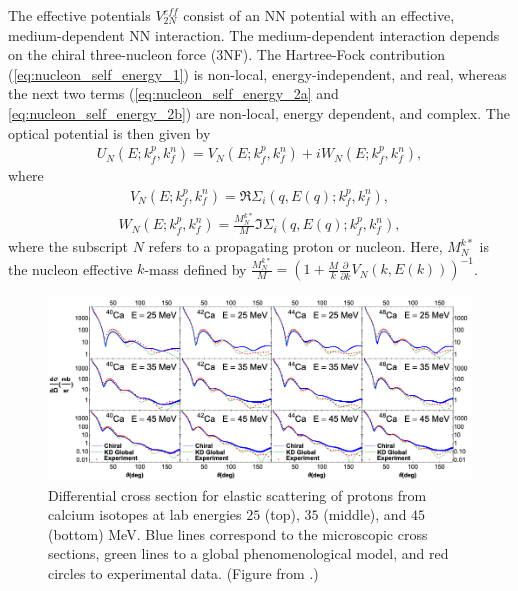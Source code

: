 \documentclass[preprintnumbers,floatfix,aps,prc,preprint,nofootinbib]{revtex4-1}
\begin{document}
The effective potentials $V_{2N}^{eff}$ consist of an NN potential with an effective, medium-dependent NN interaction. The medium-dependent interaction depends on the chiral three-nucleon force (3NF). The Hartree-Fock contribution (\ref{eq:nucleon_self_energy_1}) is non-local, energy-independent, and real, whereas the next two terms (\ref{eq:nucleon_self_energy_2a} and \ref{eq:nucleon_self_energy_2b}) are non-local, energy dependent, and complex. The optical potential is  then given by
%
\begin{eqnarray}
	\label{eq:nucleon_self_energy_optical_potential}
	U_N(E; k_f^p, k_f^n) = V_N(E; k_f^p, k_f^n) + i W_N(E; k_f^p, k_f^n),
\end{eqnarray}
%
where
\begin{eqnarray}
	\label{eq:nucleon_self_energy_optical_potential_real}
	V_N(E; k_f^p, k_f^n) = \Re \Sigma_i (q, E(q); k_f^p, k_f^n),
\end{eqnarray}
%
\begin{eqnarray}
	\label{eq:nucleon_self_energy_optical_potential_imaginary}
	W_N(E; k_f^p, k_f^n) = \frac{M_N^{k*}}{M} \Im \Sigma_i (q, E(q); k_f^p, k_f^n),
\end{eqnarray}
%
where the subscript $N$ refers to a propagating proton or nucleon. Here, $M_N^{k*}$ is the nucleon effective $k$-mass defined by $\frac{M_N^{k*}}{M} = (1+\frac{M}{k} \frac{\partial}{\partial k} V_N(k, E(k)))^{-1}$.
\\

%
\begin{figure}
	\captionsetup{singlelinecheck=false,justification=raggedright}
	\centering
	\includegraphics[width=15cm]{whitehead_figure}
	\caption{Differential cross section for elastic scattering of protons from calcium isotopes at lab energies $25$ (top), $35$ (middle), and $45$ (bottom) MeV. Blue lines correspond to the microscopic cross sections, green lines to a global phenomenological model, and red circles to experimental data. (Figure from \cite{Whitehead:2018bfs}.)}
	\label{fig:whitehead_figure}
\end{figure}
%
\end{document}

